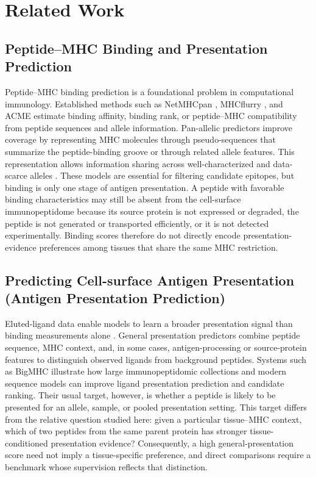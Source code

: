 \section{Related Work}

\subsection{Peptide--MHC Binding and Presentation Prediction}

Peptide--MHC binding prediction is a foundational problem in computational immunology. Established methods such as NetMHCpan \cite{reynisson2020netmhcpan}, MHCflurry \cite{odonnell2020mhcflurry}, and ACME \cite{hu2019acme} estimate binding affinity, binding rank, or peptide--MHC compatibility from peptide sequences and allele information. Pan-allelic predictors improve coverage by representing MHC molecules through pseudo-sequences that summarize the peptide-binding groove or through related allele features. This representation allows information sharing across well-characterized and data-scarce alleles \cite{nielsen2007netmhcpan,reynisson2020netmhcpan}. These models are essential for filtering candidate epitopes, but binding is only one stage of antigen presentation. A peptide with favorable binding characteristics may still be absent from the cell-surface immunopeptidome because its source protein is not expressed or degraded, the peptide is not generated or transported efficiently, or it is not detected experimentally. Binding scores therefore do not directly encode presentation-evidence preferences among tissues that share the same MHC restriction.

\subsection{Predicting Cell-surface Antigen Presentation (Antigen Presentation Prediction)}

Eluted-ligand data enable models to learn a broader presentation signal than binding measurements alone \cite{reynisson2020netmhcpan,odonnell2020mhcflurry}. General presentation predictors combine peptide sequence, MHC context, and, in some cases, antigen-processing or source-protein features to distinguish observed ligands from background peptides. Systems such as BigMHC \cite{albert2023bigmhc} illustrate how large immunopeptidomic collections and modern sequence models can improve ligand presentation prediction and candidate ranking. Their usual target, however, is whether a peptide is likely to be presented for an allele, sample, or pooled presentation setting. This target differs from the relative question studied here: given a particular tissue--MHC context, which of two peptides from the same parent protein has stronger tissue-conditioned presentation evidence? Consequently, a high general-presentation score need not imply a tissue-specific preference, and direct comparisons require a benchmark whose supervision reflects that distinction.

